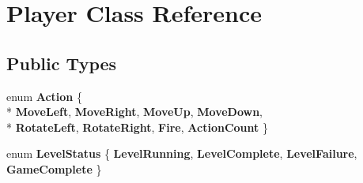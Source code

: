 \hypertarget{class_player}{}\section{Player Class Reference}
\label{class_player}
\subsection*{Public Types}
\begin{DoxyCompactItemize}
\item 
\hypertarget{class_player_a2da5df212d083bbb1460237f34ab0d88}{}enum {\bfseries Action} \{ \\*
{\bfseries Move\+Left}, 
{\bfseries Move\+Right}, 
{\bfseries Move\+Up}, 
{\bfseries Move\+Down}, 
\\*
{\bfseries Rotate\+Left}, 
{\bfseries Rotate\+Right}, 
{\bfseries Fire}, 
{\bfseries Action\+Count}
 \}\label{class_player_a2da5df212d083bbb1460237f34ab0d88}

\item 
\hypertarget{class_player_ad687adf4c664b3cef00554129e9efb44}{}enum {\bfseries Level\+Status} \{ {\bfseries Level\+Running}, 
{\bfseries Level\+Complete}, 
{\bfseries Level\+Failure}, 
{\bfseries Game\+Complete}
 \}\label{class_player_ad687adf4c664b3cef00554129e9efb44}

\end{DoxyCompactItemize}

